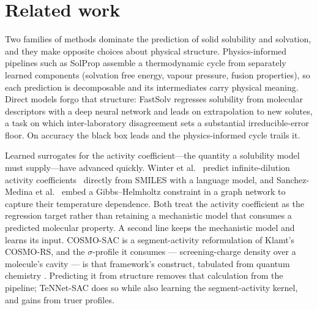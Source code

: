 \section{Related work} \label{sec:related}

Two families of methods dominate the prediction of solid solubility and solvation, and they make
opposite choices about physical structure. Physics-informed pipelines such as SolProp
\cite{vermeire2022solprop} assemble a thermodynamic cycle from separately learned components
(solvation free energy, vapour pressure, fusion properties), so each prediction is decomposable
and its intermediates carry physical meaning. Direct models forgo that structure: FastSolv
\cite{osanloo2024} regresses solubility from molecular descriptors with a deep neural network and
leads on extrapolation to new solutes, a task on which inter-laboratory disagreement sets a
substantial irreducible-error floor. On accuracy the black box leads and the
physics-informed cycle trails it.

Learned surrogates for the activity coefficient---the quantity a solubility model must supply---have
advanced quickly. Winter et al.\ \cite{winter2022} predict infinite-dilution activity coefficients
\lngi\ directly from SMILES with a language model, and Sanchez-Medina et al.\ \cite{sanchezmedina2023}
embed a Gibbs--Helmholtz constraint in a graph network to capture their temperature dependence. Both
treat the activity coefficient as the regression target rather than retaining a mechanistic
model that consumes a predicted molecular property. A second line keeps the mechanistic model and
learns its input. COSMO-SAC \cite{lin2002} is a segment-activity reformulation of Klamt's COSMO-RS,
and the $\sigma$-profile it consumes --- screening-charge density over a molecule's cavity --- is
that framework's construct, tabulated from quantum chemistry \cite{mullins2006}. Predicting it from
structure removes that calculation from the pipeline; TeNNet-SAC \cite{yang2025tennet} does so while
also learning the segment-activity kernel, and gains from truer profiles.

